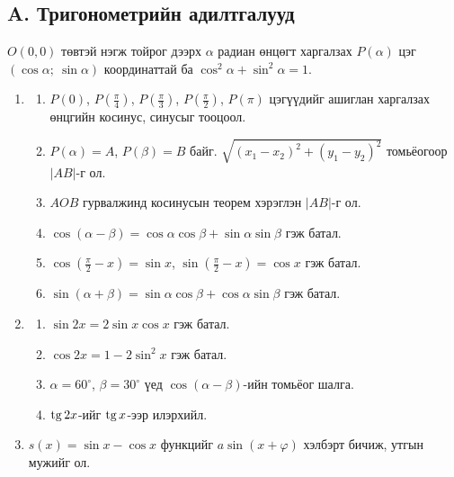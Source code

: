 \subsection*{A. Тригонометрийн адилтгалууд}
$O(0,0)$ төвтэй нэгж тойрог дээрх $\alpha$ радиан өнцөгт харгалзах $P(\alpha)$ цэг
$(\cos\alpha;\ \sin\alpha)$ координаттай ба $\cos^2\alpha+\sin^2\alpha=1$.

\begin{center}
\end{center}

\begin{enumerate}
\item
\begin{enumerate}[label=\alph*)]
  \item $P(0)$, $P\!\left(\frac{\pi}{4}\right)$, $P\!\left(\frac{\pi}{3}\right)$,
        $P\!\left(\frac{\pi}{2}\right)$, $P(\pi)$ цэгүүдийг ашиглан харгалзах өнцгийн
        косинус, синусыг тооцоол.
  \item $P(\alpha)=A$, $P(\beta)=B$ байг. $\sqrt{(x_1-x_2)^2+(y_1-y_2)^2}$ томьёогоор $|AB|$-г ол.
  \item $AOB$ гурвалжинд косинусын теорем хэрэглэн $|AB|$-г ол.
  \item $\cos(\alpha-\beta)=\cos\alpha\cos\beta+\sin\alpha\sin\beta$ гэж батал.
  \item $\cos\!\left(\frac{\pi}{2}-x\right)=\sin x$, \; $\sin\!\left(\frac{\pi}{2}-x\right)=\cos x$ гэж батал.
  \item $\sin(\alpha+\beta)=\sin\alpha\cos\beta+\cos\alpha\sin\beta$ гэж батал.
\end{enumerate}
\item
\begin{enumerate}[label=\alph*)]
  \item $\sin2x=2\sin x\cos x$ гэж батал.
  \item $\cos2x=1-2\sin^2x$ гэж батал.
  \item $\alpha=60^\circ$, $\beta=30^\circ$ үед $\cos(\alpha-\beta)$-ийн томьёог шалга.
  \item $\operatorname{tg}2x$-ийг $\operatorname{tg} x$-ээр илэрхийл.
\end{enumerate}
\item $s(x)=\sin x-\cos x$ функцийг $a\sin(x+\varphi)$ хэлбэрт бичиж, утгын мужийг ол.
\end{enumerate}


